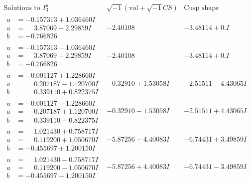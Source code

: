 \documentclass[1p]{elsarticle_modified}
\theoremstyle{definition}
\newcommand{\I}{\sqrt{-1}}
\begin{document}
$$\begin{array}{c|c|c}  
\text{Solutions to }I^u_{3}& \I (\text{vol} + \sqrt{-1}CS) & \text{Cusp shape}\\
 \hline 
\begin{aligned}
u &= -0.157313 + 1.036460 I \\
a &= \phantom{-}3.87069 - 2.29859 I \\
b &= -0.766826\phantom{ +0.000000I}\end{aligned}
 & -2.40108\phantom{ +0.000000I} & -3.48114 + 0. I\phantom{ +0.000000I} \\ \hline\begin{aligned}
u &= -0.157313 - 1.036460 I \\
a &= \phantom{-}3.87069 + 2.29859 I \\
b &= -0.766826\phantom{ +0.000000I}\end{aligned}
 & -2.40108\phantom{ +0.000000I} & -3.48114 + 0. I\phantom{ +0.000000I} \\ \hline\begin{aligned}
u &= -0.001127 + 1.228660 I \\
a &= \phantom{-}0.207187 - 1.120700 I \\
b &= \phantom{-}0.339110 + 0.822375 I\end{aligned}
 & -0.32910 + 1.53058 I & -2.51511 - 4.43065 I \\ \hline\begin{aligned}
u &= -0.001127 - 1.228660 I \\
a &= \phantom{-}0.207187 + 1.120700 I \\
b &= \phantom{-}0.339110 - 0.822375 I\end{aligned}
 & -0.32910 - 1.53058 I & -2.51511 + 4.43065 I \\ \hline\begin{aligned}
u &= \phantom{-}1.021430 + 0.758717 I \\
a &= \phantom{-}0.119200 + 1.050670 I \\
b &= -0.455697 + 1.200150 I\end{aligned}
 & -5.87256 - 4.40083 I & -6.74431 + 3.49859 I \\ \hline\begin{aligned}
u &= \phantom{-}1.021430 - 0.758717 I \\
a &= \phantom{-}0.119200 - 1.050670 I \\
b &= -0.455697 - 1.200150 I\end{aligned}
 & -5.87256 + 4.40083 I & -6.74431 - 3.49859 I \\ \hline\begin{aligned}

\end{aligned}
\end{array}$$
\end{document}

